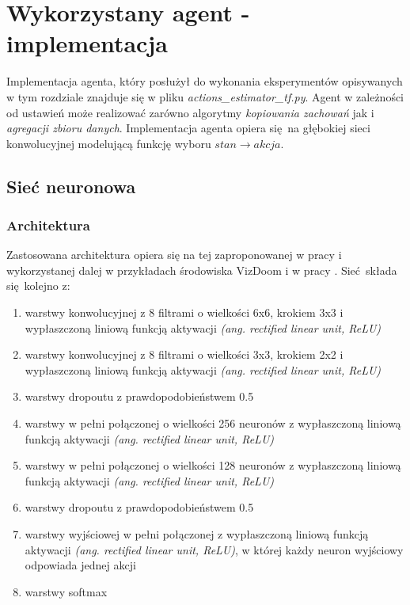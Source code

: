 \section{Wykorzystany agent - implementacja}

Implementacja agenta, który posłużył do wykonania eksperymentów opisywanych w tym rozdziale znajduje się w pliku \textit{actions\_estimator\_tf.py}. Agent w zależności od ustawień może realizować zarówno algorytmy \textit{kopiowania zachowań} jak i \textit{agregacji zbioru danych}. Implementacja agenta opiera się na głębokiej sieci konwolucyjnej modelującą funkcję wyboru $stan \rightarrow akcja$.


\subsection{Sieć neuronowa}

\subsubsection{Architektura}\label{agent_net}
Zastosowana architektura opiera się na tej zaproponowanej w pracy \cite{mnih2015human} i wykorzystanej dalej w przykładach środowiska VizDoom i w pracy \cite{DBLP:journals/corr/KempkaWRTJ16}. Sieć składa się kolejno z:

\begin{enumerate}
\item{warstwy konwolucyjnej z 8 filtrami o wielkości 6x6, krokiem 3x3 i wypłaszczoną liniową funkcją aktywacji \textit{(ang. rectified linear unit, ReLU)}}
\item{warstwy konwolucyjnej z 8 filtrami o wielkości 3x3, krokiem 2x2 i wypłaszczoną liniową funkcją aktywacji \textit{(ang. rectified linear unit, ReLU)}}
\item{warstwy dropoutu z prawdopodobieństwem 0.5}
\item{warstwy w pełni połączonej o wielkości 256 neuronów z wypłaszczoną liniową funkcją aktywacji \textit{(ang. rectified linear unit, ReLU)}}
\item{warstwy w pełni połączonej o wielkości 128 neuronów z wypłaszczoną liniową funkcją aktywacji \textit{(ang. rectified linear unit, ReLU)}}
\item{warstwy dropoutu z prawdopodobieństwem 0.5}
\item{warstwy wyjściowej w pełni połączonej z wypłaszczoną liniową funkcją aktywacji \textit{(ang. rectified linear unit, ReLU)}, w której każdy neuron wyjściowy odpowiada jednej akcji}
\item{warstwy softmax}
\end{enumerate}

